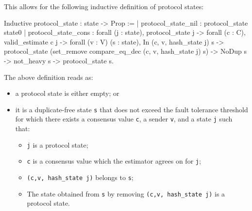 This allows for the following inductive definition of protocol states:

\begin{coq}
Inductive protocol_state : state -> Prop :=
| protocol_state_nil : protocol_state state0
| protocol_state_cons : forall (j : state),
    protocol_state j ->
    forall (c : C),
      valid_estimate c j ->
      forall (v : V) (s : state),
        In (c, v, hash_state j) s ->
        protocol_state (set_remove compare_eq_dec 
        													(c, v, hash_state j) s) ->
        NoDup s ->
        not_heavy s ->
        protocol_state s.
\end{coq}

The above definition reads as:
\begin{itemize}
    \item a protocol state is either empty; or
    \item it is a duplicate-free state \verb|s| that does not exceed the fault tolerance threshold for which
        there exists a consensus value \verb|c|, a sender \verb|v|, and a state \verb|j| such that:
        \begin{itemize}
            \item \verb|j| is a protocol state;
            \item \verb|c| is a consensus value which the estimator agrees on for \verb|j|;
            \item \verb|(c,v, hash_state j)| belongs to \verb|s|;
            \item The state obtained from \verb|s| by removing
                \verb|(c,v, hash_state j)| is a protocol state.
        \end{itemize}
\end{itemize}